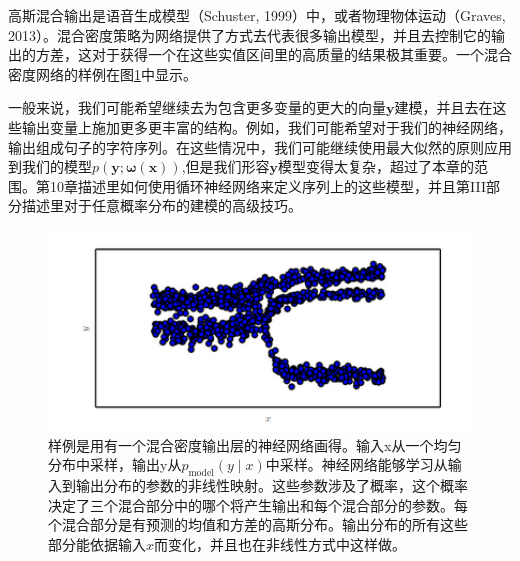 高斯混合输出是语音生成模型（Schuster, 1999）中，或者物理物体运动（Graves, 2013）。混合密度策略为网络提供了方式去代表很多输出模型，并且去控制它的输出的方差，这对于获得一个在这些实值区间里的高质量的结果极其重要。一个混合密度网络的样例在图\ref{fig:6_4}中显示。

一般来说，我们可能希望继续去为包含更多变量的更大的向量$\bm{y}$建模，并且去在这些输出变量上施加更多更丰富的结构。例如，我们可能希望对于我们的神经网络，输出组成句子的字符序列。在这些情况中，我们可能继续使用最大似然的原则应用到我们的模型$p(\bm{y};\bm{\omega(\bm{x})})$,但是我们形容$\bm{y}$模型变得太复杂，超过了本章的范围。第10章描述里如何使用循环神经网络来定义序列上的这些模型，并且第III部分描述里对于任意概率分布的建模的高级技巧。

\begin{figure}[htbp] %
   \centering
   \includegraphics[width=6in]{fig/chap6/6_4.png} 
   \centering
   \caption{样例是用有一个混合密度输出层的神经网络画得。输入x从一个均匀分布中采样，输出y从$p_{\text{model}}(y \mid x)$中采样。神经网络能够学习从输入到输出分布的参数的非线性映射。这些参数涉及了概率，这个概率决定了三个混合部分中的哪个将产生输出和每个混合部分的参数。每个混合部分是有预测的均值和方差的高斯分布。输出分布的所有这些部分能依据输入$x$而变化，并且也在非线性方式中这样做。}
   \label{fig:6_4}
\end{figure}






